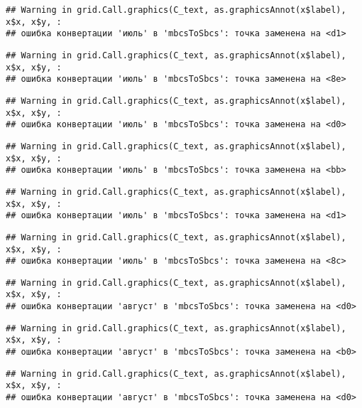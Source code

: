 \documentclass[
]{article}
\begin{document}
\begin{verbatim}
## Warning in grid.Call.graphics(C_text, as.graphicsAnnot(x$label), x$x, x$y, :
## ошибка конвертации 'июль' в 'mbcsToSbcs': точка заменена на <d1>
\end{verbatim}

\begin{verbatim}
## Warning in grid.Call.graphics(C_text, as.graphicsAnnot(x$label), x$x, x$y, :
## ошибка конвертации 'июль' в 'mbcsToSbcs': точка заменена на <8e>
\end{verbatim}

\begin{verbatim}
## Warning in grid.Call.graphics(C_text, as.graphicsAnnot(x$label), x$x, x$y, :
## ошибка конвертации 'июль' в 'mbcsToSbcs': точка заменена на <d0>
\end{verbatim}

\begin{verbatim}
## Warning in grid.Call.graphics(C_text, as.graphicsAnnot(x$label), x$x, x$y, :
## ошибка конвертации 'июль' в 'mbcsToSbcs': точка заменена на <bb>
\end{verbatim}

\begin{verbatim}
## Warning in grid.Call.graphics(C_text, as.graphicsAnnot(x$label), x$x, x$y, :
## ошибка конвертации 'июль' в 'mbcsToSbcs': точка заменена на <d1>
\end{verbatim}

\begin{verbatim}
## Warning in grid.Call.graphics(C_text, as.graphicsAnnot(x$label), x$x, x$y, :
## ошибка конвертации 'июль' в 'mbcsToSbcs': точка заменена на <8c>
\end{verbatim}

\begin{verbatim}
## Warning in grid.Call.graphics(C_text, as.graphicsAnnot(x$label), x$x, x$y, :
## ошибка конвертации 'август' в 'mbcsToSbcs': точка заменена на <d0>
\end{verbatim}

\begin{verbatim}
## Warning in grid.Call.graphics(C_text, as.graphicsAnnot(x$label), x$x, x$y, :
## ошибка конвертации 'август' в 'mbcsToSbcs': точка заменена на <b0>
\end{verbatim}

\begin{verbatim}
## Warning in grid.Call.graphics(C_text, as.graphicsAnnot(x$label), x$x, x$y, :
## ошибка конвертации 'август' в 'mbcsToSbcs': точка заменена на <d0>
\end{verbatim}
\end{document}
